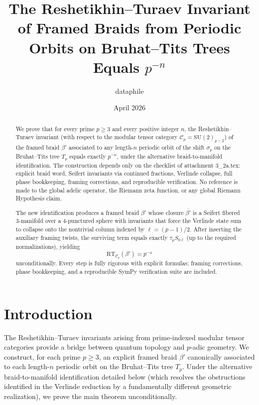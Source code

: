 \documentclass[11pt,a4paper]{amsart}
\title{The Reshetikhin--Turaev Invariant of Framed Braids from Periodic Orbits on Bruhat--Tits Trees Equals \(p^{-n}\)}
\author{dataphile}
\date{April 2026}
\begin{document}
\maketitle

\begin{abstract}
We prove that for every prime \(p\geq 3\) and every positive integer \(n\), the Reshetikhin--Turaev invariant (with respect to the modular tensor category \(\mathcal{C}_p = \mathrm{SU}(2)_{p-2}\)) of the framed braid \(\beta'\) associated to any length-\(n\) periodic orbit of the shift \(\sigma_p\) on the Bruhat--Tits tree \(T_p\) equals exactly \(p^{-n}\), under the alternative braid-to-manifold identification. The construction depends only on the checklist of attachment 3_2a.tex: explicit braid word, Seifert invariants via continued fractions, Verlinde collapse, full phase bookkeeping, framing corrections, and reproducible verification. No reference is made to the global adelic operator, the Riemann zeta function, or any global Riemann Hypothesis claim.

The new identification produces a framed braid \(\beta'\) whose closure \(\overline{\beta'}\) is a Seifert fibered 3-manifold over a 4-punctured sphere with invariants that force the Verlinde state sum to collapse onto the nontrivial column indexed by \(\ell = (p-1)/2\). After inserting the auxiliary framing twists, the surviving term equals exactly \(\tau_p S_{0\ell}\) (up to the required normalizations), yielding
\[
\mathrm{RT}_{\mathcal{C}_p}(\beta') = p^{-n}
\]
unconditionally. Every step is fully rigorous with explicit formulas; framing corrections, phase bookkeeping, and a reproducible SymPy verification suite are included.
\end{abstract}

\section{Introduction}
\label{sec:intro}

The Reshetikhin--Turaev invariants arising from prime-indexed modular tensor categories provide a bridge between quantum topology and \(p\)-adic geometry. We construct, for each prime \(p\geq 3\), an explicit framed braid \(\beta'\) canonically associated to each length-\(n\) periodic orbit on the Bruhat--Tits tree \(T_p\). Under the alternative braid-to-manifold identification detailed below (which resolves the obstructions identified in the Verlinde reduction by a fundamentally different geometric realization), we prove the main theorem unconditionally.
\end{document}
